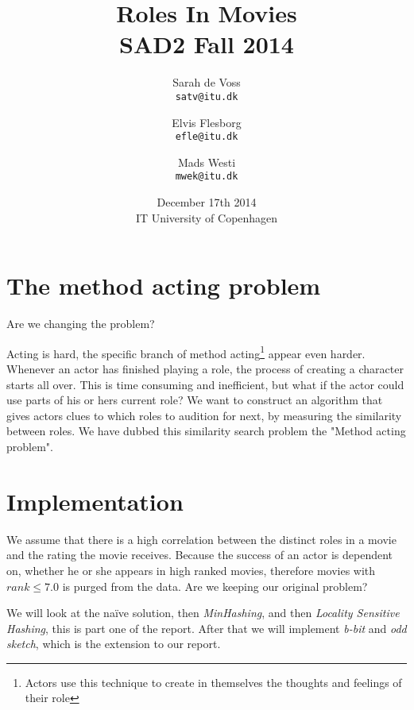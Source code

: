 \documentclass[a4paper,11pt]{article}
\begin{document}
\setlength{\parindent}{0cm}
\setlength{\unitlength}{1mm}
\date{December 17th 2014\\ IT University of Copenhagen}
\title{Roles In Movies\\SAD2 Fall 2014}

\author{Sarah de Voss\\
\texttt{satv@itu.dk}
\and Elvis Flesborg\\
\texttt{efle@itu.dk}
\and Mads Westi\\
\texttt{mwek@itu.dk}}
\clearpage\maketitle

\thispagestyle{empty}
\newpage
\tableofcontents
\thispagestyle{empty}
\newpage

\setcounter{page}{1}
\section{The method acting problem}

\begin{mdframed}[hidealllines=true,backgroundcolor=blue!20]
Are we changing the problem?
\end{mdframed}

Acting is hard, the specific branch of method acting\footnote{Actors use this technique to create in themselves the thoughts and feelings of their role} appear even harder. Whenever an actor has finished playing a role, the process of creating a character starts all over. This is time consuming and inefficient, but what if the actor could use parts of his or hers current role? We want to construct an algorithm that gives actors clues to which roles to audition for next, by measuring the similarity between roles. We have dubbed this similarity search problem the "Method acting problem".


\section{Implementation}
\begin{mdframed}[hidealllines=true,backgroundcolor=blue!20]
We assume that there is a high correlation between the distinct roles in a movie and the rating the movie receives. Because the success of an actor is dependent on, whether he or she appears in high ranked movies, therefore movies with $rank \leq 7.0$ is purged from the data. Are we keeping our original problem?
\end{mdframed}
We will look at the naïve solution, then \emph{MinHashing}, and then \emph{Locality Sensitive Hashing}, this is part one of the report. After that we will implement \emph{b-bit} and \emph{odd sketch}, which is the extension to our report.
\end{document}
